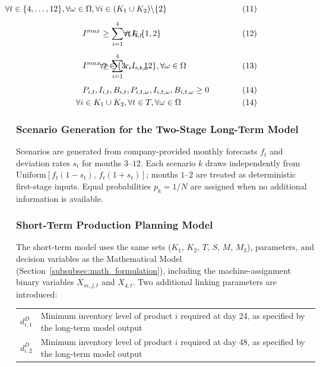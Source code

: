 \documentclass[11pt]{article}
\begin{document}
\begin{alignat}{4}
&&& && \hspace{-9cm} \forall t\in \{4,\dots,12\},\forall \omega \in \Omega,\forall i\in (K_1 \cup K_2)\backslash \{2\} &&\tag{11}\\[4pt]
&&& I^{max} \geq \sum_{i=1}^{4} r_i I_{i,t} && \hspace{-4cm}\forall t\in \{1,2\} &&\tag{12}\\[4pt]
&&& I^{max} \geq \sum_{i=1}^{4} r_i I_{i,t,\omega} && \hspace{-5cm}\forall t\in \{3,\dots,12\},\forall \omega\in\Omega &&\tag{13}\\[4pt]
&&& P_{i,t},I_{i,t},B_{i,t},P_{i,t,\omega},I_{i,t,\omega},B_{i,t,\omega} \geq 0
&&  &&\tag{14}\\
&&& && \hspace{-6cm}\forall i\in K_1 \cup K_2,\forall t\in T,\forall \omega \in \Omega &&\tag{14} 
\end{alignat}




\subsubsection{Scenario Generation for the Two-Stage Long-Term Model}
\label{sec:scenario_generation}

Scenarios are generated from company-provided monthly forecasts $f_t$ and deviation rates $s_t$ for months $3$--$12$. Each scenario $k$ draws independently from $\mathrm{Uniform}[f_t(1-s_t),\, f_t(1+s_t)]$; months $1$--$2$ are treated as deterministic first-stage inputs. Equal probabilities $p_k = 1/N$ are assigned when no additional information is available.


\subsubsection{Short-Term Production Planning Model}

The short-term model uses the same sets ($K_1$, $K_2$, $T$, $S$, $M$, $M_3$), parameters, and decision variables as the Mathematical Model (Section~\ref{subsubsec:math_formulation}), including the machine-assignment binary variables $X_{m,j,t}$ and $X_{4,t}$. Two additional linking parameters are introduced:

\begin{center}
\begin{tabular}{@{}lp{10cm}@{}}
\toprule
$d^D_{i,1}$ & Minimum inventory level of product $i$ required at day 24, as specified by the long-term model output \\[4pt]
$d^D_{i,2}$ & Minimum inventory level of product $i$ required at day 48, as specified by the long-term model output \\
\bottomrule
\end{tabular}
\end{center}
\end{document}
